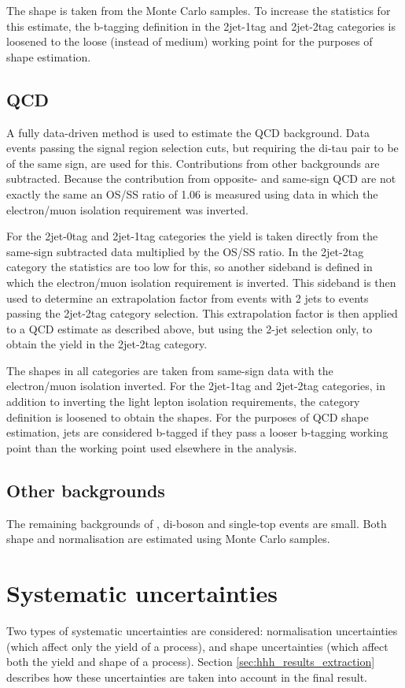 The \Wjets shape is taken from the Monte Carlo samples. To 
increase the statistics for this estimate, the b-tagging definition
in the 2jet-1tag and 2jet-2tag categories is loosened to the loose (instead of medium)
working point for the purposes of shape estimation.


\subsection{QCD}
\label{sec:hhh_backgrounds_qcd}
A fully data-driven method is used to estimate the QCD background. Data events
passing the signal region selection cuts, but requiring the di-tau pair to be
of the same sign, are used for this. Contributions from other backgrounds are 
subtracted. Because the contribution from opposite- and same-sign QCD are
not exactly the same an OS/SS ratio of 1.06 is measured using data in which
the electron/muon isolation requirement was inverted. 

For the 2jet-0tag and 2jet-1tag categories the yield is taken directly from
the same-sign subtracted data multiplied by the OS/SS ratio. In the 2jet-2tag
category the statistics are too low for this, so another sideband is defined
in which the electron/muon isolation requirement is inverted. This 
sideband is then used to determine an extrapolation factor from events
with 2 jets to events passing the 2jet-2tag category selection. This extrapolation
factor is then applied to a QCD estimate as described above, but using the 2-jet 
selection only, to obtain the yield in the 2jet-2tag category.

The shapes in all categories are taken from same-sign data with the electron/muon
isolation inverted. For the 2jet-1tag and 2jet-2tag categories, in addition to 
inverting the light lepton isolation requirements, the category definition
is loosened to obtain the shapes. For the purposes of QCD shape
estimation, jets are considered b-tagged if they pass a looser b-tagging
working point than the working point used elsewhere in the analysis.

\subsection{Other backgrounds}
\label{sec:hhh_backgrounds_other}
The remaining backgrounds of \Zellell, di-boson and single-top
events are small. Both shape and normalisation are
estimated using Monte Carlo samples.
 

\section{Systematic uncertainties}
\label{sec:hhh_uncs}
Two types of systematic uncertainties are considered: normalisation
uncertainties (which affect only the yield of a process), and shape
uncertainties (which affect both the yield and shape of a process). Section \ref{sec:hhh_results_extraction}
describes how these uncertainties are taken into account in the final result.

